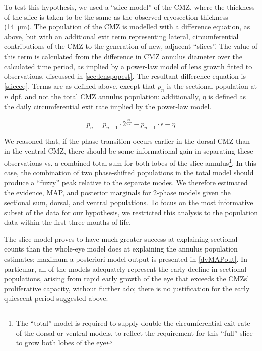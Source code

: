 To test this hypothesis, we used a ``slice model'' of the CMZ, where the thickness of the slice is taken to be the same as the observed cryosection thickness (\SI{14}{\micro\metre}). The population of the CMZ is modelled with a difference equation, as above, but with an additional exit term representing lateral, circumferential contributions of the CMZ to the generation of new, adjacent ``slices''. The value of this term is calculated from the difference in CMZ annulus diameter over the calculated time period, as implied by a power-law model of lens growth fitted to observations, discussed in \autoref{sec:lenspopest}. The resultant difference equation is \autoref{sliceeq}. Terms are as defined above, except that $p_n$ is the sectional population at $n$ dpf, and not the total CMZ annulus population; additionally, $\eta$ is defined as the daily circumferential exit rate implied by the power-law model.

\begin{equation}
    p_n=p_{n-1} \cdot 2^{\frac{24}{CT}} - p_{n-1} \cdot \epsilon - \eta
    \label{sliceeq}
\end{equation}

We reasoned that, if the phase transition occurs earlier in the dorsal CMZ than in the ventral CMZ, there should be some informational gain in separating these observations vs. a combined total sum for both lobes of the slice annulus\footnote{The ``total'' model is required to supply double the circumferential exit rate of the dorsal or ventral models, to reflect the requirement for this ``full'' slice to grow both lobes of the eye}. In this case, the combination of two phase-shifted populations in the total model should produce a ``fuzzy'' peak relative to the separate modes. We therefore estimated the evidence, MAP, and posterior marginals for 2-phase models given the sectional sum, dorsal, and ventral populations. To focus on the most informative subset of the data for our hypothesis, we restricted this analysis to the population data within the first three months of life.

The slice model proves to have much greater success at explaining sectional counts than the whole-eye model does at explaining the annulus population estimates; maximum a posteriori model output is presented in \autoref{dvMAPout}. In particular, all of the models adequately represent the early decline in sectional populations, arising from rapid early growth of the eye that exceeds the CMZs' proliferative capacity, without further ado; there is no justification for the early quiescent period suggested above.

